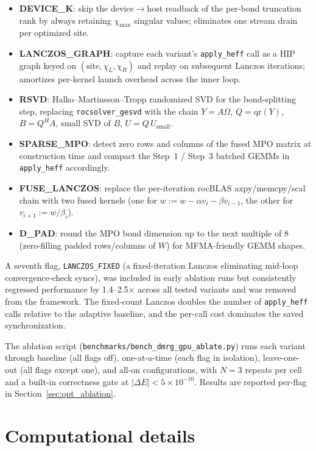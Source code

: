 \documentclass[preprint,12pt]{elsarticle}
\begin{document}
\begin{itemize}
\item \textbf{DEVICE\_K}: skip the device$\to$host readback of the per-bond truncation rank by always retaining $\chi_\text{max}$ singular values; eliminates one stream drain per optimized site.
\item \textbf{LANCZOS\_GRAPH}: capture each variant's \texttt{apply\_heff} call as a HIP graph keyed on $(\text{site}, \chi_L, \chi_R)$ and replay on subsequent Lanczos iterations; amortizes per-kernel launch overhead across the inner loop.
\item \textbf{RSVD}: Halko--Martinsson--Tropp randomized SVD for the bond-splitting step, replacing \texttt{rocsolver\_gesvd} with the chain $Y = A\Omega$, $Q = \mathrm{qr}(Y)$, $B = Q^H A$, small SVD of $B$, $U = Q\,U_\text{small}$.
\item \textbf{SPARSE\_MPO}: detect zero rows and columns of the fused MPO matrix at construction time and compact the Step~1 / Step~3 batched GEMMs in \texttt{apply\_heff} accordingly.
\item \textbf{FUSE\_LANCZOS}: replace the per-iteration rocBLAS axpy/memcpy/scal chain with two fused kernels (one for $w := w - \alpha v_i - \beta v_{i-1}$, the other for $v_{i+1} := w / \beta_i$).
\item \textbf{D\_PAD}: round the MPO bond dimension up to the next multiple of 8 (zero-filling padded rows/columns of $W$) for MFMA-friendly GEMM shapes.
\end{itemize}

A seventh flag, \texttt{LANCZOS\_FIXED} (a fixed-iteration Lanczos eliminating mid-loop convergence-check syncs), was included in early ablation runs but consistently regressed performance by 1.4--2.5$\times$ across all tested variants and was removed from the framework.
The fixed-count Lanczos doubles the number of \texttt{apply\_heff} calls relative to the adaptive baseline, and the per-call cost dominates the saved synchronization.

The ablation script (\texttt{benchmarks/bench\_dmrg\_gpu\_ablate.py}) runs each variant through baseline (all flags off), one-at-a-time (each flag in isolation), leave-one-out (all flags except one), and all-on configurations, with $N=3$ repeats per cell and a built-in correctness gate at $|\Delta E| < 5\times 10^{-10}$.
Results are reported per-flag in Section~\ref{sec:opt_ablation}.


\section{Computational details}
\label{sec:computational}
\end{document}

